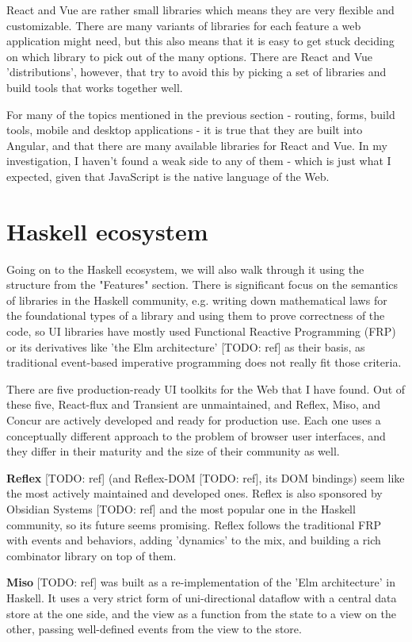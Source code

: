 \documentclass[english,odsaz]{fitthesis}
\begin{document}
React and Vue are rather small libraries which means they are very flexible and
customizable. There are many variants of libraries for each feature a web
application might need, but this also means that it is easy to get stuck
deciding on which library to pick out of the many options. There are React and
Vue 'distributions', however, that try to avoid this by picking a set of libraries and
build tools that works together well.

For many of the topics mentioned in the previous section - routing, forms, build
tools, mobile and desktop applications - it is true that they are built into
Angular, and that there are many available libraries for React and Vue.
In my investigation, I haven't found a weak side to any of them - which is just
what I expected, given that JavaScript is the native language of the Web.

\section{Haskell ecosystem}
\label{sec:org17c89fc}
Going on to the Haskell ecosystem, we will also walk through it using the
structure from the "Features" section. There is significant focus on the
semantics of libraries in the Haskell community, e.g. writing down mathematical
laws for the foundational types of a library and using them to prove correctness
of the code, so UI libraries have mostly used Functional Reactive Programming
(FRP) or its derivatives like 'the Elm architecture' [TODO: ref] as their basis,
as traditional event-based imperative programming does not really fit those
criteria.

There are five production-ready UI toolkits for the Web that I have found. Out
of these five, React-flux and Transient are unmaintained, and Reflex, Miso, and
Concur are actively developed and ready for production use. Each one uses a
conceptually different approach to the problem of browser user interfaces, and
they differ in their maturity and the size of their community as well.

\textbf{Reflex} [TODO: ref] (and Reflex-DOM [TODO: ref], its DOM bindings) seem like the
most actively maintained and developed ones. Reflex is also sponsored by
Obsidian Systems [TODO: ref] and the most popular one in the Haskell community,
so its future seems promising. Reflex follows the traditional FRP with events
and behaviors, adding 'dynamics' to the mix, and building a rich combinator
library on top of them.

\textbf{Miso} [TODO: ref] was built as a re-implementation of the 'Elm architecture' in
Haskell. It uses a very strict form of uni-directional dataflow with a central
data store at the one side, and the view as a function from the state to a view
on the other, passing well-defined events from the view to the store.
\end{document}
